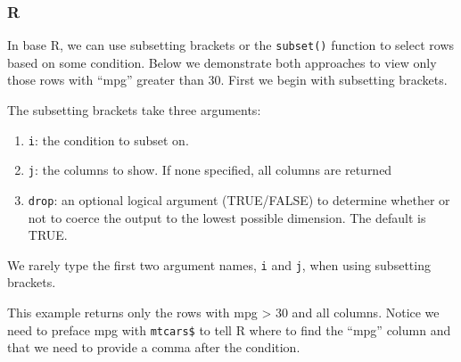 \documentclass[
]{book}
\newenvironment{Shaded}{\begin{snugshade}}{\end{snugshade}}
\newcommand{\DecValTok}[1]{\textcolor[rgb]{0.00,0.00,0.81}{#1}}
\newcommand{\FloatTok}[1]{\textcolor[rgb]{0.00,0.00,0.81}{#1}}
\newcommand{\NormalTok}[1]{#1}
\newcommand{\SpecialCharTok}[1]{\textcolor[rgb]{0.00,0.00,0.00}{#1}}
\providecommand{\tightlist}{%
  \setlength{\itemsep}{0pt}\setlength{\parskip}{0pt}}
\begin{document}
\hypertarget{r-19}{%
\subsubsection*{R}\label{r-19}}

In base R, we can use subsetting brackets or the \texttt{subset()} function to select rows based on some condition. Below we demonstrate both approaches to view only those rows with ``mpg'' greater than 30. First we begin with subsetting brackets.

The subsetting brackets take three arguments:

\begin{enumerate}
\def\labelenumi{\arabic{enumi}.}
\tightlist
\item
  \texttt{i}: the condition to subset on.
\item
  \texttt{j}: the columns to show. If none specified, all columns are returned
\item
  \texttt{drop}: an optional logical argument (TRUE/FALSE) to determine whether or not to coerce the output to the lowest possible dimension. The default is TRUE.
\end{enumerate}

We rarely type the first two argument names, \texttt{i} and \texttt{j}, when using subsetting brackets.

This example returns only the rows with mpg \textgreater{} 30 and all columns. Notice we need to preface mpg with \texttt{mtcars\$} to tell R where to find the ``mpg'' column and that we need to provide a comma after the condition.

\begin{Shaded}
\end{Shaded}
\end{document}
